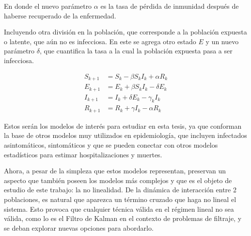 En donde el nuevo parámetro $\alpha$ es la tasa de pérdida de inmunidad después de haberse recuperado de la enfermedad.

Incluyendo otra división en la población, que corresponde a la población expuesta o latente, que aún no es infecciosa. En este se agrega otro estado $E$ y un nuevo parámetro $\delta$, que cuantifica la tasa a la cual la población expuesta pasa a ser infecciosa.

\begin{equation}
    \begin{aligned}
        S_{k+1} &= S_k - \beta S_k I_k + \alpha R_k  \\
        E_{k+1} &= E_k + \beta S_k I_k - \delta E_k  \\
        I_{k+1} &= I_k + \delta E_k - \gamma_k I_k \\
        R_{k+1} &= R_k + \gamma I_k - \alpha R_k 
    \end{aligned}
    \label{eq:SEIR}
\end{equation}

Estos serán los modelos de interés para estudiar en esta tesis, ya que conforman la base de otros modelos muy utilizados en epidemiología, que incluyen infectados asintomáticos, sintomáticos y que se pueden conectar con otros modelos estadísticos para estimar hospitalizaciones y muertes.

Ahora, a pesar de la simpleza que estos modelos representan, preservan un aspecto que también poseen los modelos más complejos y que es el objeto de estudio de este trabajo: la no linealidad. De la dinámica de interacción entre 2 poblaciones, es natural que aparezca un término cruzado que haga no lineal el sistema. Esto provoca que cualquier técnica válida en el régimen lineal no sea válida, como lo es el Filtro de Kalman en el contexto de problemas de filtraje, y se deban explorar nuevas opciones para abordarlo.


